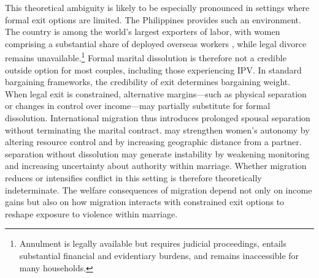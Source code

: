 \documentclass[12pt]{article}
\begin{document}
This theoretical ambiguity is likely to be especially pronounced in settings where formal exit options are limited. The Philippines provides such an environment. The country is among the world’s largest exporters of labor, with women comprising a substantial share of deployed overseas workers \citep{mcauliffe2024world}, while legal divorce remains unavailable.\footnote{Annulment is legally available but requires judicial proceedings, entails substantial financial and evidentiary burdens, and remains inaccessible for many households.} Formal marital dissolution is therefore not a credible outside option for most couples, including those experiencing IPV. In standard bargaining frameworks, the credibility of exit determines bargaining weight. When legal exit is constrained, alternative margins—such as physical separation or changes in control over income—may partially substitute for formal dissolution. International migration thus introduces prolonged spousal separation without terminating the marital contract.  may strengthen women’s autonomy by altering resource control and by increasing geographic distance from a partner.  separation without dissolution may generate instability by weakening monitoring and increasing uncertainty about authority within marriage. Whether migration reduces or intensifies conflict in this setting is therefore theoretically indeterminate.  The welfare consequences of migration depend not only on income gains but also on how migration interacts with constrained exit options to reshape exposure to violence within marriage.

\end{document}
